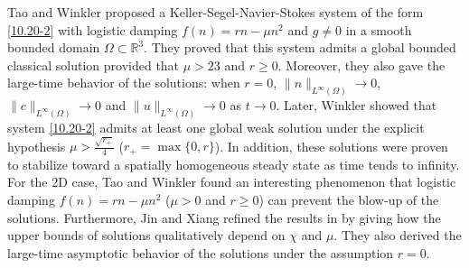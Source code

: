 \documentclass[reqno]{amsart}
\begin{document}
Tao and Winkler \cite{s1468-31} proposed a Keller-Segel-Navier-Stokes system of the 
form \eqref{10.20-2} with logistic damping $ f(n) = rn -\mu n^2 $ and 
$ g \neq 0 $ in a smooth bounded domain $\Omega \subset \mathbb{R}^3$. 
They proved that this system admits a global bounded classical solution provided that 
$\mu>23$ and $r\geq0$. Moreover, they also gave the large-time behavior of the 
solutions: when $r=0$, $\|n\|_{L^\infty(\Omega)}\rightarrow 0$, 
$\|c\|_{L^\infty(\Omega)}\rightarrow 0$ and $\|u\|_{L^\infty(\Omega)}\rightarrow 0$ 
as $t\rightarrow 0$. Later, Winkler \cite{Winkler2019}
showed that system \eqref{10.20-2} admits at least one global weak solution under the 
explicit hypothesis $\mu>\frac{\sqrt{r_+}}{4}$ ($r_+=\max\{0,r\}$). 
In addition, these solutions were proven to stabilize toward a spatially homogeneous 
steady state as time tends to infinity. For the 2D case, Tao and Winkler
\cite{s1468-30} found an interesting phenomenon that logistic damping 
$ f(n) = rn -\mu n^2 $ ($\mu>0$ and $r\geq0$) can prevent the blow-up of the solutions. 
Furthermore, Jin and Xiang \cite{Jin} refined the results in \cite{s1468-30} by giving 
how the upper bounds of solutions  qualitatively depend on $\chi$ and $\mu$. 
They also derived the large-time asymptotic behavior of the solutions under the 
assumption $r = 0$.
\end{document}
